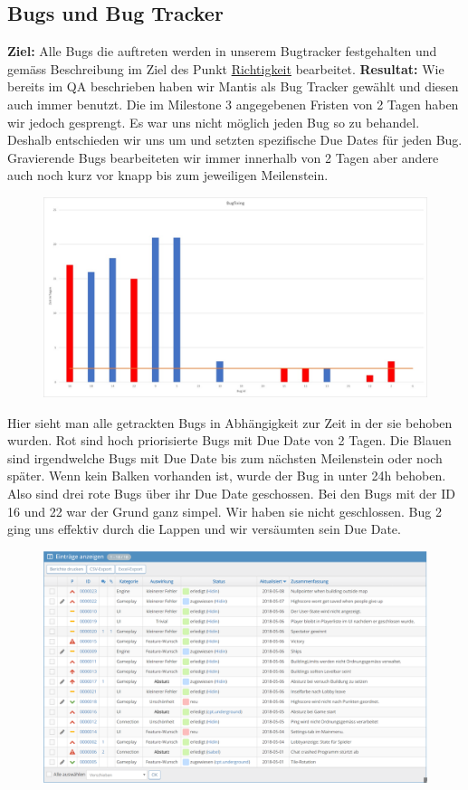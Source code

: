 \documentclass[]{scrartcl}
\newcommand{\n}{\newline}
\begin{document}
\subsection{Bugs und Bug Tracker}
\label{ssec:Bugs}
\textbf{Ziel:} Alle Bugs die auftreten werden in unserem Bugtracker festgehalten und gemäss Beschreibung im Ziel des Punkt \hyperref[sec:Richtigkeit]{Richtigkeit} bearbeitet.\n
\textbf{Resultat:} Wie bereits im QA beschrieben haben wir Mantis als Bug Tracker gewählt und diesen auch immer benutzt. Die im Milestone 3 angegebenen Fristen von 2 Tagen haben wir jedoch gesprengt. Es war uns nicht möglich jeden Bug so zu behandel. Deshalb entschieden wir uns um und setzten spezifische Due Dates für jeden Bug. Gravierende Bugs bearbeiteten wir immer innerhalb von 2 Tagen aber andere auch noch kurz vor knapp bis zum jeweiligen Meilenstein. 
\begin{figure}[H]
	\includegraphics[width=\linewidth]{bugs/tabel.jpeg}
\end{figure}
Hier sieht man alle getrackten Bugs in Abhängigkeit zur Zeit in der sie behoben wurden. Rot sind hoch priorisierte Bugs mit Due Date von 2 Tagen. Die Blauen sind irgendwelche Bugs mit Due Date bis zum nächsten Meilenstein oder noch später. Wenn kein Balken vorhanden ist, wurde der Bug in unter 24h behoben. Also sind drei rote Bugs über ihr Due Date geschossen. Bei den Bugs mit der ID 16 und 22 war der Grund ganz simpel. Wir haben sie nicht geschlossen. Bug 2 ging uns effektiv durch die Lappen und wir versäumten sein Due Date. 
\begin{figure}[H]
	\includegraphics[width=\linewidth]{bugs/mantis.png}
\end{figure}
\end{document}
